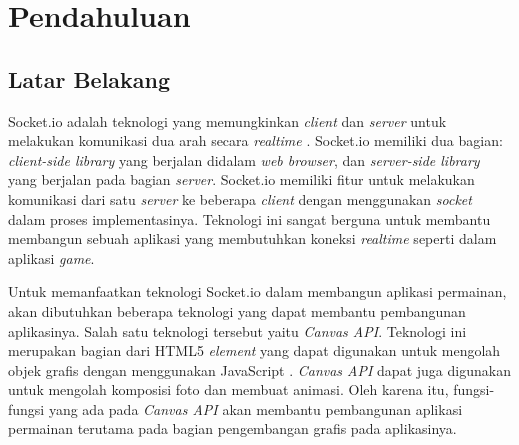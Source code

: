 \chapter{Pendahuluan}
\label{chap:intro}
   
\section{Latar Belakang}
\label{sec:label}



Socket.io adalah teknologi yang memungkinkan \textit{client} dan \textit{server} untuk melakukan komunikasi dua arah secara \textit{realtime} \cite{rauch:11:socketiodocs}. Socket.io memiliki dua bagian: \textit{client-side library} yang berjalan didalam \textit{web browser}, dan \textit{server-side library} yang berjalan pada bagian \textit{server}. Socket.io memiliki fitur untuk melakukan komunikasi dari satu \textit{server} ke beberapa \textit{client} dengan menggunakan \textit{socket} dalam proses implementasinya. Teknologi ini sangat berguna untuk membantu membangun sebuah aplikasi yang membutuhkan koneksi \textit{realtime} seperti dalam aplikasi \textit{game}.

Untuk memanfaatkan teknologi Socket.io dalam membangun aplikasi permainan, akan dibutuhkan beberapa teknologi yang dapat membantu pembangunan aplikasinya. Salah satu teknologi tersebut yaitu \textit{Canvas API}. Teknologi ini merupakan bagian dari HTML5 \textit{element} yang dapat digunakan untuk mengolah objek grafis dengan menggunakan JavaScript \cite{moz:04:canvasapi}. \textit{Canvas API} dapat juga digunakan untuk mengolah komposisi foto dan membuat animasi. Oleh karena itu, fungsi-fungsi yang ada pada \textit{Canvas API} akan membantu pembangunan aplikasi permainan terutama pada bagian pengembangan grafis pada aplikasinya.

